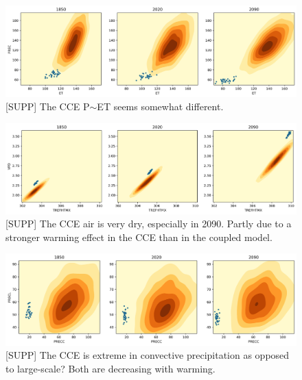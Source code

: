 \documentclass[11pt]{article}
\begin{document}
\begin{figure}[h]
\centering
\includegraphics[width=40pc]{figs/contours/ET_PREC_contours.png}
\caption{[SUPP] The CCE P$\sim$ET seems somewhat different.}
\label{fig:precip}
\end{figure}

\begin{figure}[h]
\centering
\includegraphics[width=40pc]{figs/contours/TREFHTMX_VPD_contours.png}
\caption{[SUPP] The CCE air is very dry, especially in 2090. Partly due to a stronger warming effect in the CCE than in the coupled model.}
\label{fig:precip}
\end{figure}


\begin{figure}[h]
\centering
\includegraphics[width=40pc]{figs/contours/PRECC_PRECL_contours.png}
\caption{[SUPP] The CCE is extreme in convective precipitation as opposed to large-scale? Both are decreasing with warming.}
\label{fig:precip}
\end{figure}



\nocite{*}

\end{document}
